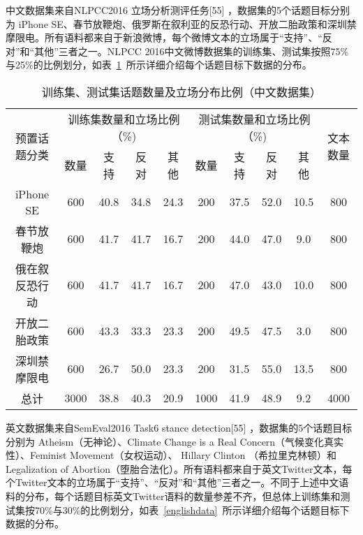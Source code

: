 中文数据集来自NLPCC2016 立场分析测评任务[55] ，数据集的5个话题目标分别为 iPhone SE、春节放鞭炮、俄罗斯在叙利亚的反恐行动、开放二胎政策和深圳禁摩限电。所有语料都来自于新浪微博，每个微博文本的立场属于“支持”、“反对”和“其他”三者之一。NLPCC 2016中文微博数据集的训练集、测试集按照75\%与25\%的比例划分，如表~\ref{chinesedata}~所示详细介绍每个话题目标下数据的分布。
\begin{table}[htbp]
	\caption[table123]{训练集、测试集话题数量及立场分布比例（中文数据集）}
	\label{chinesedata}
	\vspace{0.5em}\centering\wuhao
	\begin{tabular}{cccccccccc}
		\toprule[1.5pt]
		\multirow{2}{*}{预置话题分类}& \multicolumn{4}{c}{训练集数量和立场比例（\%)} 
		& \multicolumn{4}{c}{测试集数量和立场比例（\%)}  &\multirow{2}{*}{文本数量}\\
		\cline{2-9}
		\quad&数量& 支持&反对&其他&数量& 支持&反对&其他 \\
		\midrule[1pt]
		iPhone SE&600&40.8&34.8&24.3&200&37.5&52.0&10.5&800\\
		春节放鞭炮&600&41.7&41.7&16.7&200&44.0&47.0&9.0&800\\
		俄在叙反恐行动&600&41.7&41.7&16.7&200&47.0&43.0&10.0&800\\
		开放二胎政策&600&43.3&33.3&23.3&200&49.5&47.5&3.0&800\\
		深圳禁摩限电&600&26.7&50.0&23.3&200&31.5&55.0&13.5&800\\
		总计&3000&38.8&40.3&20.9&1000&41.9&48.9&9.2&4000\\
		\bottomrule[1.5pt]
	\end{tabular}
\end{table}

英文数据集来自SemEval2016 Task6 stance detection[55] ，数据集的5个话题目标分别为 Atheism（无神论）、Climate Change is a Real Concern（气候变化真实性）、Feminist Movement（女权运动）、 Hillary Clinton （希拉里克林顿）和
Legalization of Abortion（堕胎合法化）。所有语料都来自于英文Twitter文本，每个Twitter文本的立场属于“支持”、“反对”和“其他”三者之一。不同于上述中文语料的分布，每个话题目标英文Twitter语料的数量参差不齐，但总体上训练集和测试集按70\%与30\%的比例划分，如表~\ref{englishdata}~所示详细介绍每个话题目标下数据的分布。


